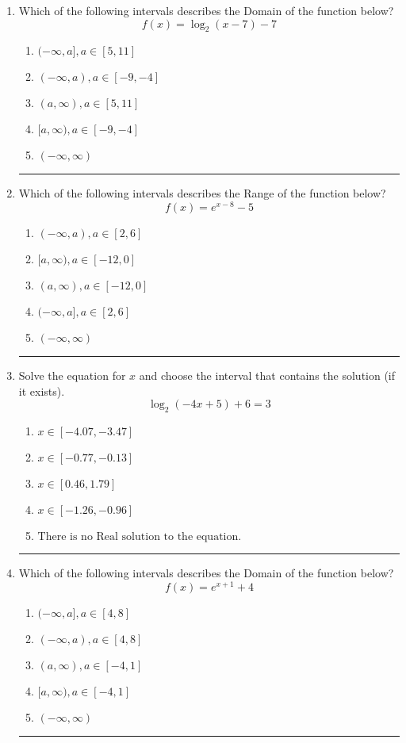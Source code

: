 \documentclass[14pt]{extbook}
\newcommand{\litem}[1]{\item#1\hspace*{-1cm}\rule{\textwidth}{0.4pt}}
\begin{document}
\begin{enumerate}
{\begin{enumerate}[label=\Alph*.]
\end{enumerate} }
\litem{
Which of the following intervals describes the Domain of the function below?\[ f(x) = \log_2{(x-7)}-7 \]\begin{enumerate}[label=\Alph*.]
\item \( (-\infty, a], a \in [5, 11] \)
\item \( (-\infty, a), a \in [-9, -4] \)
\item \( (a, \infty), a \in [5, 11] \)
\item \( [a, \infty), a \in [-9, -4] \)
\item \( (-\infty, \infty) \)

\end{enumerate} }
\litem{
Which of the following intervals describes the Range of the function below?\[ f(x) = e^{x-8}-5 \]\begin{enumerate}[label=\Alph*.]
\item \( (-\infty, a), a \in [2, 6] \)
\item \( [a, \infty), a \in [-12, 0] \)
\item \( (a, \infty), a \in [-12, 0] \)
\item \( (-\infty, a], a \in [2, 6] \)
\item \( (-\infty, \infty) \)

\end{enumerate} }
\litem{
Solve the equation for $x$ and choose the interval that contains the solution (if it exists).\[ \log_{2}{(-4x+5)}+6 = 3 \]\begin{enumerate}[label=\Alph*.]
\item \( x \in [-4.07, -3.47] \)
\item \( x \in [-0.77, -0.13] \)
\item \( x \in [0.46, 1.79] \)
\item \( x \in [-1.26, -0.96] \)
\item \( \text{There is no Real solution to the equation.} \)

\end{enumerate} }
\litem{
Which of the following intervals describes the Domain of the function below?\[ f(x) = e^{x+1}+4 \]\begin{enumerate}[label=\Alph*.]
\item \( (-\infty, a], a \in [4, 8] \)
\item \( (-\infty, a), a \in [4, 8] \)
\item \( (a, \infty), a \in [-4, 1] \)
\item \( [a, \infty), a \in [-4, 1] \)
\item \( (-\infty, \infty) \)


\end{enumerate}}
\end{enumerate}
\end{document}
